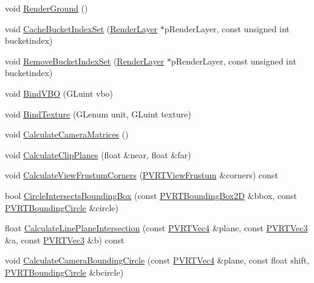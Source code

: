 \begin{DoxyCompactItemize}
\item 
void \hyperlink{class_o_g_l_e_s_navigation_af17cdbb48c9bc5d2c0c09603872828bf}{Render\+Ground} ()
\item 
void \hyperlink{class_o_g_l_e_s_navigation_a0a043039bc19b8064c0e8edb196f19b1}{Cache\+Bucket\+Index\+Set} (\hyperlink{struct_render_layer}{Render\+Layer} $\ast$p\+Render\+Layer, const unsigned int bucketindex)
\item 
void \hyperlink{class_o_g_l_e_s_navigation_ab45b34ab4f09e558f7570c2a95af6711}{Remove\+Bucket\+Index\+Set} (\hyperlink{struct_render_layer}{Render\+Layer} $\ast$p\+Render\+Layer, const unsigned int bucketindex)
\item 
void \hyperlink{class_o_g_l_e_s_navigation_a740b63abf5cec61d554b569b661e8bd3}{Bind\+V\+B\+O} (G\+Luint vbo)
\item 
void \hyperlink{class_o_g_l_e_s_navigation_a2bb8f2fd72fabca3dc28ab4d46445405}{Bind\+Texture} (G\+Lenum unit, G\+Luint texture)
\item 
void \hyperlink{class_o_g_l_e_s_navigation_ad54acd9d44fc9ab591ff57dc0b451b97}{Calculate\+Camera\+Matrices} ()
\item 
void \hyperlink{class_o_g_l_e_s_navigation_a0f2bc69f3215287a65baf082c5a8c2a0}{Calculate\+Clip\+Planes} (float \&near, float \&far)
\item 
void \hyperlink{class_o_g_l_e_s_navigation_ad542512ddb314a3b293afda1ac29899e}{Calculate\+View\+Frustum\+Corners} (\hyperlink{struct_p_v_r_t_view_frustum}{P\+V\+R\+T\+View\+Frustum} \&corners) const 
\item 
bool \hyperlink{class_o_g_l_e_s_navigation_a4c2f55657919359e022145a91cd77f8f}{Circle\+Intersects\+Bounding\+Box} (const \hyperlink{struct_p_v_r_t_bounding_box2_d}{P\+V\+R\+T\+Bounding\+Box2\+D} \&bbox, const \hyperlink{struct_p_v_r_t_bounding_circle}{P\+V\+R\+T\+Bounding\+Circle} \&circle)
\item 
float \hyperlink{class_o_g_l_e_s_navigation_a5fc44930aac0929f079c11701d27edba}{Calculate\+Line\+Plane\+Intersection} (const \hyperlink{struct_p_v_r_t_vec4}{P\+V\+R\+T\+Vec4} \&plane, const \hyperlink{struct_p_v_r_t_vec3}{P\+V\+R\+T\+Vec3} \&a, const \hyperlink{struct_p_v_r_t_vec3}{P\+V\+R\+T\+Vec3} \&b) const 
\item 
void \hyperlink{class_o_g_l_e_s_navigation_ae88e63610de8eea60dd865d98be62b89}{Calculate\+Camera\+Bounding\+Circle} (const \hyperlink{struct_p_v_r_t_vec4}{P\+V\+R\+T\+Vec4} \&plane, const float shift, \hyperlink{struct_p_v_r_t_bounding_circle}{P\+V\+R\+T\+Bounding\+Circle} \&bcircle)
\item 

\end{DoxyCompactItemize}
